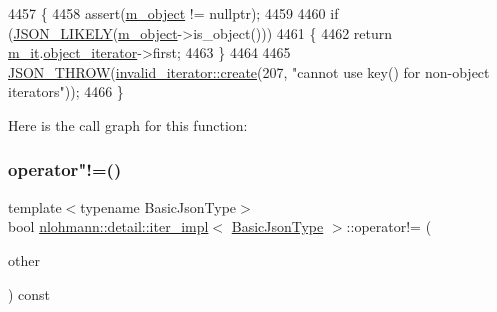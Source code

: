 \begin{DoxyCode}
4457     \{
4458         assert(\hyperlink{classnlohmann_1_1detail_1_1iter__impl_aca84f84be598bdfaaddd23d928c42bbb}{m\_object} != \textcolor{keyword}{nullptr});
4459 
4460         \textcolor{keywordflow}{if} (\hyperlink{json_8hpp_a41ecd1c4cf7c3d56477b9b685b5daa72}{JSON\_LIKELY}(\hyperlink{classnlohmann_1_1detail_1_1iter__impl_aca84f84be598bdfaaddd23d928c42bbb}{m\_object}->is\_object()))
4461         \{
4462             \textcolor{keywordflow}{return} \hyperlink{classnlohmann_1_1detail_1_1iter__impl_a8a86a7c0d4af0cc4ab345b6f0e13cdfa}{m\_it}.\hyperlink{structnlohmann_1_1detail_1_1internal__iterator_a8cb0af3498061426c1d0a65ad6220408}{object\_iterator}->first;
4463         \}
4464 
4465         \hyperlink{json_8hpp_a6c274f6db2e65c1b66c7d41b06ad690f}{JSON\_THROW}(\hyperlink{classnlohmann_1_1detail_1_1invalid__iterator_a4e849260a3caa1b288c7e619130c6c09}{invalid\_iterator::create}(207, \textcolor{stringliteral}{"cannot use key() for
       non-object iterators"}));
4466     \}
\end{DoxyCode}
Here is the call graph for this function\+:
\mbox{\label{classnlohmann_1_1detail_1_1iter__impl_aeab0e2b5da70b3bdebecd5b1a6ee66a6}} 
\subsubsection{\texorpdfstring{operator"!=()}{operator!=()}}
{\footnotesize\ttfamily template$<$typename Basic\+Json\+Type$>$ \\
bool \hyperlink{classnlohmann_1_1detail_1_1iter__impl}{nlohmann\+::detail\+::iter\+\_\+impl}$<$ \hyperlink{classnlohmann_1_1detail_1_1iter__impl_abf18f18793f84b0222aebb5a2a87da7a}{Basic\+Json\+Type} $>$\+::operator!= (\begin{DoxyParamCaption}\item[{const \hyperlink{classnlohmann_1_1detail_1_1iter__impl}{iter\+\_\+impl}$<$ \hyperlink{classnlohmann_1_1detail_1_1iter__impl_abf18f18793f84b0222aebb5a2a87da7a}{Basic\+Json\+Type} $>$ \&}]{other }\end{DoxyParamCaption}) const\hspace{0.3cm}{\ttfamily [inline]}}



